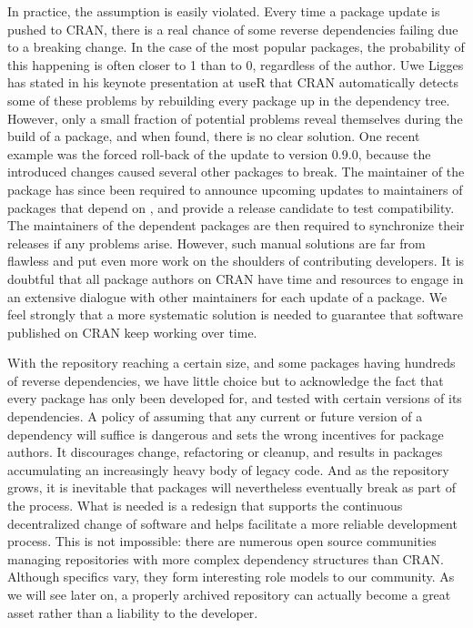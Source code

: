 In practice, the assumption is easily violated. Every time a package update is
pushed to CRAN, there is a real chance of some reverse dependencies failing due
to a breaking change. In the case of the most popular packages, the probability of
this happening is often closer to 1 than to 0, regardless of the author.
Uwe Ligges has stated in his keynote presentation at useR that CRAN
automatically detects some of these problems by rebuilding every package up in the dependency
tree. However, only a small fraction of potential problems
reveal themselves during the build of a package, and when found, there is no
clear solution.
One recent example was the forced roll-back of the 
\citep{ggplot2} update to version 0.9.0, because the introduced changes caused several other packages to break. The maintainer of the  package has since been
required to announce upcoming updates to maintainers of packages that depend on
, and provide a release candidate to test compatibility. The
maintainers of the dependent packages are then required to synchronize their
releases if any problems arise. However, such manual solutions are far from
flawless and put even more work on the shoulders of contributing developers. It
is doubtful that all package authors on CRAN have time and resources to engage
in an extensive dialogue with other maintainers for each update of a package.
We feel strongly that a more systematic solution is needed to guarantee that
software published on CRAN keep working over time.

With the repository reaching a certain size, and some packages having hundreds
of reverse dependencies, we have little choice but to acknowledge the fact that
every package has only been developed for, and tested with certain versions of
its dependencies. A policy of assuming that any current or future version of a
dependency will suffice is dangerous and sets the wrong incentives for package
authors. It discourages change, refactoring or cleanup, and results in packages
accumulating an increasingly heavy body of legacy code. And as the repository
grows, it is inevitable that packages will nevertheless eventually break as part
of the process.
What is needed is a redesign that supports the continuous decentralized change
of software and helps facilitate a more reliable development process. This is not
impossible: there are numerous open source communities managing repositories with
more complex dependency structures than CRAN. Although specifics vary, they form
interesting role models to our community. As we will see later on, a properly
archived repository can actually become a great asset rather than a liability to
the developer.

